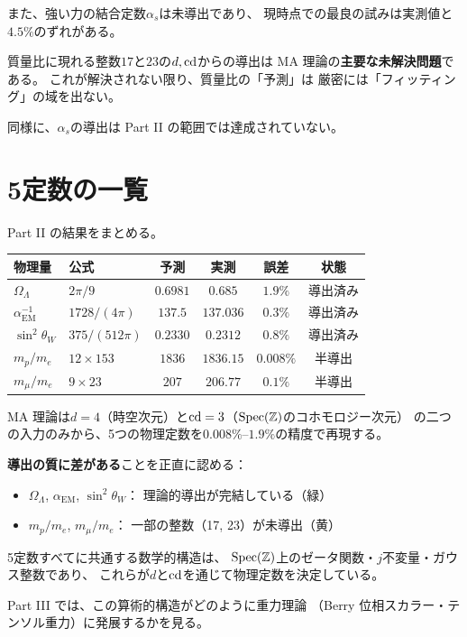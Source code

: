 また、強い力の結合定数$\alpha_s$は未導出であり、
現時点での最良の試みは実測値と$4.5\%$のずれがある。

\begin{warningbox}
質量比に現れる整数$17$と$23$の$d,\operatorname{cd}$からの導出は
MA 理論の\textbf{主要な未解決問題}である。
これが解決されない限り、質量比の「予測」は
厳密には「フィッティング」の域を出ない。

同様に、$\alpha_s$の導出は Part II の範囲では達成されていない。
\end{warningbox}

\section{5定数の一覧}
\label{sec:five-constants-table}

Part II の結果をまとめる。

\begin{center}
\renewcommand{\arraystretch}{1.4}
\begin{tabular}{>{\raggedright}p{2.8cm} l c c c c}
\toprule
\textbf{物理量} & \textbf{公式} & \textbf{予測} & \textbf{実測} & \textbf{誤差} & \textbf{状態} \\
\midrule
$\Omega_\Lambda$
  & $2\pi/9$
  & $0.6981$
  & $0.685$
  & $1.9\%$
  & \colorbox{green!20}{導出済み} \\[4pt]
$\alpha_{\mathrm{EM}}^{-1}$
  & $1728/(4\pi)$
  & $137.5$
  & $137.036$
  & $0.3\%$
  & \colorbox{green!20}{導出済み} \\[4pt]
$\sin^2\theta_W$
  & $375/(512\pi)$
  & $0.2330$
  & $0.2312$
  & $0.8\%$
  & \colorbox{green!20}{導出済み} \\[4pt]
$m_p/m_e$
  & $12 \times 153$
  & $1836$
  & $1836.15$
  & $0.008\%$
  & \colorbox{yellow!40}{半導出} \\[4pt]
$m_\mu/m_e$
  & $9 \times 23$
  & $207$
  & $206.77$
  & $0.1\%$
  & \colorbox{yellow!40}{半導出} \\
\bottomrule
\end{tabular}
\end{center}

\begin{keyresult}
MA 理論は$d = 4$（時空次元）と$\operatorname{cd} = 3$（$\operatorname{Spec}(\mathbb{Z})$のコホモロジー次元）
の二つの入力のみから、5つの物理定数を$0.008\%$--$1.9\%$の精度で再現する。

\medskip
\textbf{導出の質に差がある}ことを正直に認める：
\begin{itemize}[nosep]
\item $\Omega_\Lambda$, $\alpha_{\mathrm{EM}}$, $\sin^2\theta_W$：
  理論的導出が完結している（\colorbox{green!20}{緑}）
\item $m_p/m_e$, $m_\mu/m_e$：
  一部の整数（17, 23）が未導出（\colorbox{yellow!40}{黄}）
\end{itemize}

5定数すべてに共通する数学的構造は、
$\operatorname{Spec}(\mathbb{Z})$上のゼータ関数・$j$不変量・ガウス整数であり、
これらが$d$と$\operatorname{cd}$を通じて物理定数を決定している。

Part III では、この算術的構造がどのように重力理論
（Berry 位相スカラー・テンソル重力）に発展するかを見る。
\end{keyresult}
